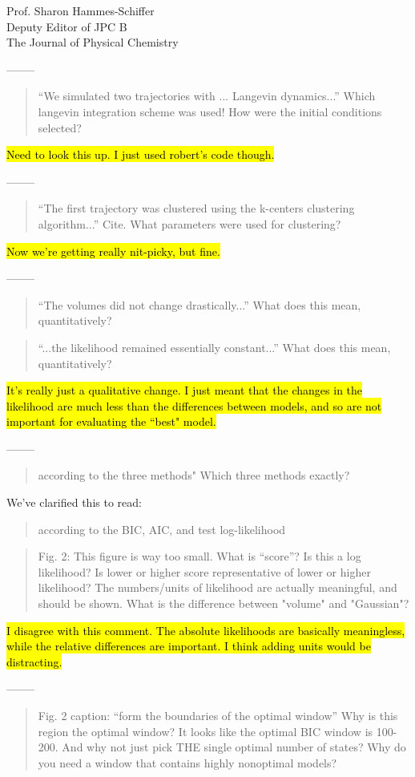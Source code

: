 \documentclass{letter}
\newcommand{\separate}{\begin{center}--------\end{center}}
\begin{document}
\begin{letter}{Prof. Sharon Hammes-Schiffer \\ Deputy Editor of JPC B \\ The Journal of Physical Chemistry}
\separate
\begin{quote}
``We simulated two trajectories with ... Langevin dynamics...''  Which langevin integration scheme was used!  How were the initial conditions selected?
\end{quote}
\hl{Need to look this up. I just used robert's code though.}

\separate
\begin{quote}
``The first trajectory was clustered using the k-centers clustering algorithm...'' Cite.  What parameters were used for clustering?
\end{quote}
\hl{Now we're getting really nit-picky, but fine.}

\separate
\begin{quote}
``The volumes did not change drastically...'' What does this mean, quantitatively?
\end{quote}

\begin{quote}
``...the likelihood remained essentially constant...'' What does this mean, quantitatively?
\end{quote}
\hl{It's really just a qualitative change. I just meant that the changes in the likelihood are much less than the differences between models, and so are not important for evaluating the ``best" model.}

\separate
\begin{quote}
according to the three methods" Which three methods exactly?
\end{quote}
We've clarified this to read:
\begin{quote}
according to the BIC, AIC, and test log-likelihood
\end{quote}

\begin{quote}
Fig. 2: This figure is way too small.  What is ``score''?  Is this a log likelihood?  Is lower or higher score representative of lower or higher likelihood?  The numbers/units of likelihood are actually meaningful, and should be shown.  What is the difference between "volume" and "Gaussian"?
\end{quote}
\hl{I disagree with this comment. The absolute likelihoods are basically meaningless, while the relative differences are important. I think adding units would be distracting.} 

\separate
\begin{quote}
Fig. 2 caption: ``form the boundaries of the optimal window''  Why is this region the optimal window?  It looks like the optimal BIC window is 100-200.  And why not just pick THE single optimal number of states?  Why do you need a window that contains highly nonoptimal models?
\end{quote}


\end{letter}
\end{document}
